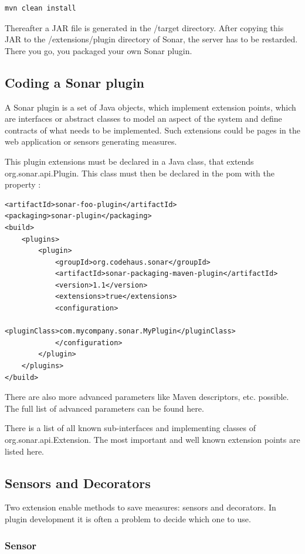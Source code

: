 \begin{verbatim}
mvn clean install
\end{verbatim}

Thereafter a JAR file is generated in the /target directory. After
copying this JAR to the /extensions/plugin directory of Sonar, the
server has to be restarded. There you go, you packaged your own Sonar
plugin.

\subsection{Coding a Sonar plugin}
A Sonar plugin is a set of Java objects, which implement extension
points, which are interfaces or abstract classes to model an aspect of
the system and define contracts of what needs to be implemented. Such
extensions could be pages in the web application or sensors generating
measures.

This plugin extensions must be declared in a Java class, that extends
org.sonar.api.Plugin. This class must then be declared in the pom with
the property :

\begin{verbatim}
<artifactId>sonar-foo-plugin</artifactId>
<packaging>sonar-plugin</packaging>
<build>
    <plugins>
        <plugin>
            <groupId>org.codehaus.sonar</groupId>
            <artifactId>sonar-packaging-maven-plugin</artifactId>
            <version>1.1</version>
            <extensions>true</extensions>
            <configuration>
                <pluginClass>com.mycompany.sonar.MyPlugin</pluginClass>
            </configuration>
        </plugin>
    </plugins>
</build>
\end{verbatim}

There are also more advanced parameters like Maven descriptors,
etc. possible. The full list of advanced parameters can be found here.

There is a list of all known sub-interfaces and implementing classes
of org.sonar.api.Extension. The most important and well known
extension points are listed here.

\subsection{Sensors and Decorators}
Two extension enable methods to save measures: sensors and
decorators. In plugin development it is often a problem to decide
which one to use.

\subsubsection{Sensor}


